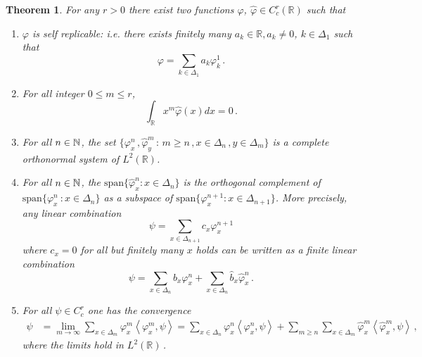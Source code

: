 \documentclass[12pt]{article}
\numberwithin{equation}{section}
\theoremstyle{plain}
\newtheorem{theorem}{Theorem}[section]
\theoremstyle{definition}
\newcommand{\scalar}[1]{\left\langle #1 \right\rangle}
\newcommand{\R}{\ensuremath{{\mathbb R}}}
\newcommand{\myspan}{\text{span}}
\def\bR{\mathbb{R}}\def\bS{\mathbb{S}}
\begin{document}
\begin{theorem}\label{thm_wave}
For any $r>0$  there exist two functions $\varphi$, $\hat\varphi\in C^r_c(\bR)$ such that
    \begin{enumerate}
        \item $\varphi$ is self replicable: i.e. there exists finitely many $a_k\in\bR, a_k\neq 0$, $k\in\Delta_1$ such that  
        \begin{equation}\label{eq:selfReplicable}
            \varphi= \sum_{k\in\Delta_1}a_k \varphi^1_k\,.
        \end{equation}
        \item For all integer $0\leq m\le r$,
        \[\int_{\R} x^m \hat{\varphi}(x) dx=0\,.\]

        \item For all $n\in\mathbb{N}$, the set  $\{\varphi^n_x\,,\hat\varphi^m_y\, \colon \,m\ge n\,,x\in\Delta_n\,,y\in\Delta_m\}$ is a complete orthonormal system of $L^2(\R)$.

        \item For all $n\in\mathbb{N}$, the $\myspan\{\hat\varphi_x^n\colon x\in\Delta_n\}$ is the orthogonal complement of $ \myspan\{\varphi_x^n~\colon x\in\Delta_n\}$ as a subspace of $\myspan\{\varphi_x^{n+1}\colon x\in\Delta_{n+1}\}$. More precisely, any linear combination
        \[
            \psi = \sum_{x\in\Delta_{n+1}} c_x\varphi^{n+1}_x
        \]
        where $c_x = 0$ for all but finitely many $x$ holds can be written as a finite linear combination
        \[
            \psi = \sum_{x\in\Delta_n} b_x\varphi^n_x + \sum_{x\in\Delta_n} \hat b_x\hat\varphi_x^n\,.
        \]
        

        \item For all $\psi\in C_c^r$ one has the convergence
        \begin{align}
            \psi &= \lim_{m\to\infty} \sum_{x\in\Delta_m}\varphi_x^m\scalar{\varphi_x^m,\psi}\label{eq:daubechi1}= \sum_{x\in\Delta_n}\varphi_x^n\scalar{\varphi_x^n,\psi} + \sum_{m\ge n} \sum_{x\in\Delta_m}\hat\varphi_x^m\scalar{\hat\varphi_x^m,\psi}\,,
        \end{align}
        where the limits hold in $L^2(\bR)$\,.
    \end{enumerate}
\end{theorem}
    
\end{document}
